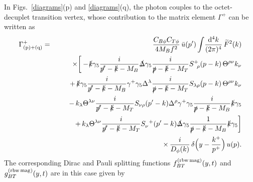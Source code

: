 \documentclass[preprintnumbers,prd,superscriptaddress,preprint]{revtex4-1}
\begin{document}
In Figs.~\ref{diagrams}(p) and \ref{diagrams}(q), the photon couples to the octet-decuplet transition vertex, whose contribution to the matrix element $\Gamma^+$ can be written as
%
%
\begin{eqnarray} 
\label{eq.FG_BTphi}
\Gamma_{\rm (p)+(q)}^+
&=& \frac{C_{B\phi}C_{T\phi}}{4 M_B f^2}\,
\bar{u}(p')
\int\!\frac{\dd[4]{k}}{(2\pi)^4}\,
\widetilde{F}^2(k)
\nonumber\\
&& \times
\bigg[
-\!\slashed{k}\gamma_5
\frac{i}{\slashed{p'}-\slashed{k}-M_B}
\slashed{\Delta}\gamma_5
\frac{i}{\slashed{p}-\slashed{k}-M_T}
S^+_{\ \, \rho}(p-k)\,
\Theta^{\rho\nu} k_\nu
\nonumber\\
&& \hspace*{0.6cm}
+\, \slashed{k}\gamma_5
\frac{i}{\slashed{p'}-\slashed{k}-M_B}
\gamma^+\gamma_5\Delta^\lambda\frac{i}{\slashed{p}-\slashed{k}-M_T}
S_{\lambda\rho}(p-k)\,
\Theta^{\rho\nu}k_\nu
\nonumber\\
&& \hspace*{0.6cm}
-\, k_\lambda\Theta^{\lambda\nu}
\frac{i}{\slashed{p'}-\slashed{k}-M_T}
S_{\nu\rho}(p^\prime-k) 
\Delta^\rho \gamma^+ \gamma_5
\frac{i}{\slashed{p}-\slashed{k}-M_B}
\slashed{k}\gamma_5
\nonumber\\
&& \hspace*{0.6cm}
+\, k_\lambda\Theta^{\lambda\nu}
\frac{i}{\slashed{p'}-\slashed{k}-M_T}
S_\nu^{\ \, +}(p^\prime-k)
\slashed{\Delta} \gamma_5\frac{1}{\slashed{p}-\slashed{k}-M_B}
\slashed{k}\gamma_5
\bigg]
\nonumber\\
&& \times\,
\frac{i}{D_\phi(k)}\,
\delta\Big(y-\frac{k^+}{p^+}\Big)\,
u(p).
\end{eqnarray}
%
The corresponding Dirac and Pauli splitting functions
$f^{\rm (rbw\, mag)}_{BT}(y,t)$ and $g^{\rm (rbw\, mag)}_{BT}(y,t)$ 
are in this case given by
%
\end{document}
